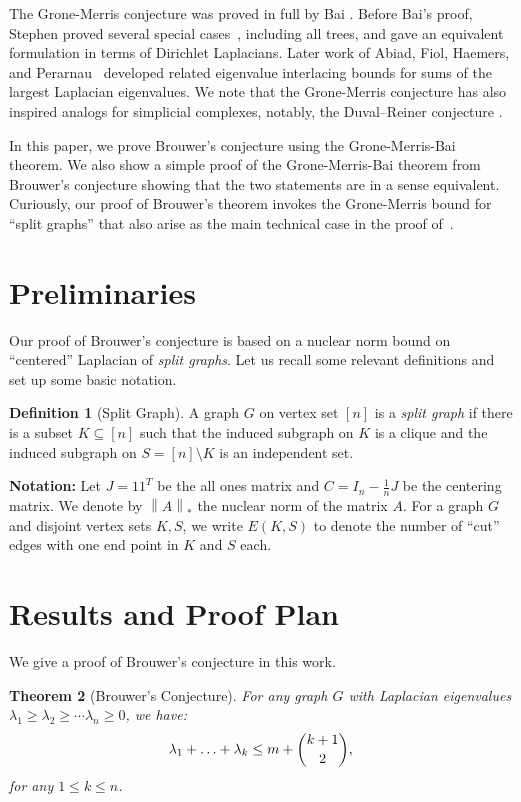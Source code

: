 \documentclass[10pt,reqno]{amsart}
\newtheorem{theorem}{Theorem}[section]
\theoremstyle{definition}
\newtheorem{definition}[theorem]{Definition}
\theoremstyle{remark}
\numberwithin{equation}{section}
\newcommand{\norm}[1]{\left\| #1 \right\|}
\begin{document}
The Grone-Merris conjecture was proved in full by Bai \cite{Bai}. Before Bai's proof, Stephen proved several special cases~\cite{Stephen2007}, including all trees, and gave an equivalent formulation in terms of Dirichlet Laplacians. Later work of Abiad, Fiol, Haemers, and Perarnau~\cite{AbiadFiolHaemersPerarnau2014} developed related eigenvalue interlacing bounds for sums of the largest Laplacian eigenvalues. We note that the Grone-Merris conjecture has also inspired analogs for simplicial complexes, notably, the Duval--Reiner conjecture \cite{DuvalReiner2002}.

In this paper, we prove Brouwer's conjecture using the Grone-Merris-Bai theorem. We also show a simple proof of the Grone-Merris-Bai theorem from Brouwer's conjecture showing that the two statements are in a sense equivalent. Curiously, our proof of Brouwer's theorem invokes the Grone-Merris bound for ``split graphs'' that also arise as the main technical case in the proof of~\cite{Bai}.


\section{Preliminaries} Our proof of Brouwer's conjecture is based on a nuclear norm bound on ``centered'' Laplacian of \emph{split graphs}. Let us recall some relevant definitions and set up some basic notation. 

\begin{definition}[Split Graph]
A graph $G$ on vertex set $[n]$ is a \emph{split graph} if there is a subset $K \subseteq [n]$ such that the induced subgraph on $K$ is a clique and the induced subgraph on $S=[n] \setminus K$ is an independent set.
\end{definition}

\textbf{Notation:} Let $J=11^T$ be the all ones matrix and  $C=I_n-\frac{1}{n}J$ be the centering matrix. We denote by $\norm{A}_*$ the nuclear norm of the matrix $A$. For a graph $G$ and disjoint vertex sets $K,S$, we write $E(K,S)$ to denote the number of ``cut'' edges with one end point in $K$ and $S$ each. 



\section{Results and Proof Plan}

We give a proof of Brouwer's conjecture in this work. 

\begin{theorem}[Brouwer's Conjecture]\label{thm:brouwer}
For any graph $G$ with Laplacian eigenvalues $\lambda_1 \geq \lambda_2 \geq \cdots \lambda_n\geq 0$, we have:
    $$\lambda_1+\ldots+\lambda_k\le m+\dbinom{k+1}{2},$$
    for any $1\le k\le n$.
\end{theorem}
\end{document}
